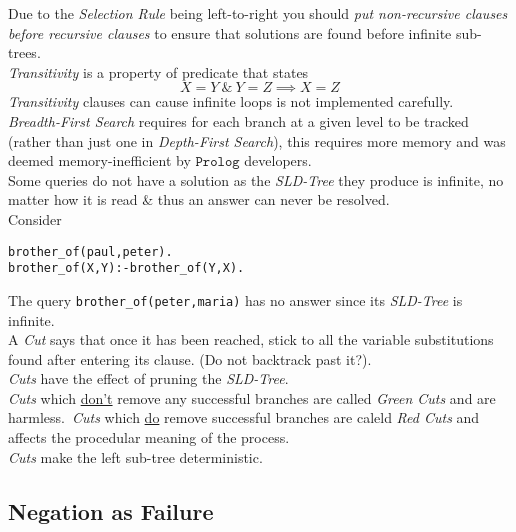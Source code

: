 \documentclass[11pt,a4paper]{article}
\begin{document}
Due to the \textit{Selection Rule} being left-to-right you should \textit{put non-recursive clauses before recursive clauses} to ensure that solutions are found before infinite sub-trees.\\

\textit{Transitivity} is a property of predicate that states
$$X=Y\ \&\ Y=Z\implies X=Z$$
\textit{Transitivity} clauses can cause infinite loops is not implemented carefully.\\

\textit{Breadth-First Search} requires for each branch at a given level to be tracked (rather than just one in \textit{Depth-First Search}), this requires more memory and was deemed memory-inefficient by $\mathtt{Prolog}$ developers.\\

Some queries do not have a solution as the \textit{SLD-Tree} they produce is infinite, no matter how it is read \& thus an answer can never be resolved.\\
Consider
\begin{lstlisting}
brother_of(paul,peter).
brother_of(X,Y):-brother_of(Y,X).
\end{lstlisting}
The query \lstinline!brother_of(peter,maria)! has no answer since its \textit{SLD-Tree} is infinite.\\

A \textit{Cut} says that once it has been reached, stick to all the variable substitutions found after entering its clause. (\ie Do not backtrack past it?).\\
\textit{Cuts} have the effect of pruning the \textit{SLD-Tree}.\\
\textit{Cuts} which \underline{don't} remove any successful branches are called \textit{Green Cuts} and are harmless.\ \textit{Cuts} which \underline{do} remove successful branches are caleld \textit{Red Cuts} and affects the procedular meaning of the process.\\
\nb \textit{Cuts} make the left sub-tree deterministic.\\


\subsection{Negation as Failure}
\end{document}

